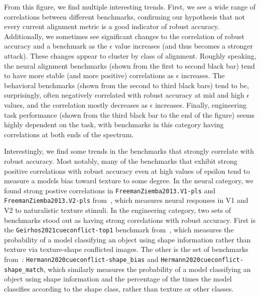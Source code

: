 From this figure, we find multiple interesting trends. First, we see a wide range of correlations between different benchmarks, confirming our hypothesis that not every current alignment metric is a good indicator of robust accuracy. Additionally, we sometimes see significant changes to the correlation of robust accuracy and a benchmark as the $\epsilon$ value increases (and thus becomes a stronger attack). These changes appear to cluster by class of alignment. Roughly speaking, the neural alignment benchmarks (shown from the first to second black bar) tend to have more stable (and more positive) correlations as $\epsilon$ increases. The behavioral benchmarks (shown from the second to third black bars) tend to be, surprisingly, often negatively correlated with robust accuracy at mid and high $\epsilon$ values, and the correlation mostly decreases as $\epsilon$ increases. Finally, engineering task performance (shown from the third black bar to the end of the figure) seems highly dependent on the task, with benchmarks in this category having correlations at both ends of the spectrum. 

Interestingly, we find some trends in the benchmarks that strongly correlate with robust accuracy. Most notably, many of the benchmarks that exhibit strong positive correlations with robust accuracy even at high values of epsilon tend to measure a models bias toward texture to some degree. In the neural category, we found strong postive correlations in \texttt{FreemanZiemba2013.V1-pls} and \texttt{FreemanZiemba2013.V2-pls} from~\cite{freeman_functional_2013}, which measures neural responses in V1 and V2 to naturalistic texture stimuli. In the engineering category, two sets of benchmarks stood out as having strong correlations with robust accuracy. First is the \texttt{Geirhos2021cueconflict-top1} benchmark from~\cite{geirhos_imagenet-trained_2019}, which measures the probability of a model classifying an object using shape information rather than texture via  texture-shape conflicted images. The other is the set of benchmarks from~\cite{hermann_origins_2020}: \texttt{Hermann2020cueconflict-shape\_bias} and \texttt{Hermann2020cueconflict-shape\_match}, which similarly measures the probability of a model classifying an object using shape information and the percentage of the times the model classifies according to the shape class, rather than texture or other classes.



